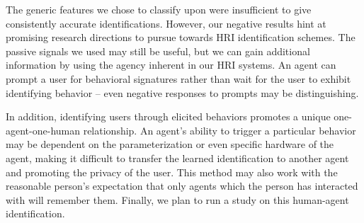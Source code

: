 \documentclass[conference]{IEEEtran}
\begin{document}
The generic features we chose to classify upon were insufficient to give consistently accurate identifications. However, our negative results hint at promising research directions to pursue towards HRI identification schemes. The passive signals we used may still be useful, but we can gain additional information by using the agency inherent in our HRI systems. An agent can prompt a user for behavioral signatures rather than wait for the user to exhibit identifying behavior -- even negative responses to prompts may be distinguishing. 

In addition, identifying users through elicited behaviors promotes a unique one-agent-one-human relationship. An agent's ability to trigger a particular behavior may be dependent on the parameterization or even specific hardware of the agent, making it difficult to transfer the learned identification to another agent and promoting the privacy of the user. This method may also work with the reasonable person's expectation that only agents which the person has interacted with will remember them. Finally, we plan to run a study on this human-agent identification. 





\end{document}
